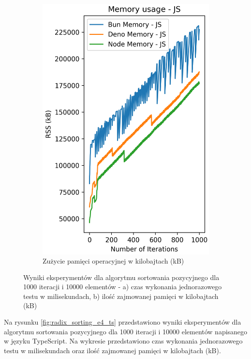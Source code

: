 \begin{figure}[H]
\begin{subfigure}[b]{0.4\textwidth}
    \includegraphics[width=\textwidth]{Figures/sorting/sorting_radix_1000_10000_js_memory.png}
    \caption{Zużycie pamięci operacyjnej w kilobajtach (kB)}
    \label{fig:radix_sorting_e4_memory}
  \end{subfigure}
  \hfill
  \caption{Wyniki eksperymentów dla algorytmu sortowania pozycyjnego dla 1000 iteracji i 10000 elementów - a) czas wykonania jednorazowego testu w milisekundach, b) ilość zajmowanej pamięci w kilobajtach (kB)}
  \label{fig:radix_sorting_e4}
\end{figure}

Na rysunku \ref{fig:radix_sorting_e4_ts} przedstawiono wyniki eksperymentów dla algorytmu sortowania pozycyjnego dla 1000 iteracji i 10000 elementów napisanego w języku TypeScript. Na wykresie przedstawiono czas wykonania jednorazowego testu w milisekundach oraz ilość zajmowanej pamięci w kilobajtach (kB).

